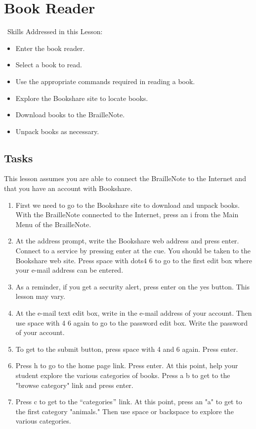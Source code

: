 \documentclass[10pt,letterpaper,twoside]{report}
\begin{document}
{{{\section{ Book Reader}
\
Skills Addressed in this Lesson:
\begin{itemize}
	\item Enter the book reader.
	\item Select a book to read.
	\item Use the appropriate commands required in reading a book.
	\item Explore the Bookshare site to locate books.
	\item Download books to the BrailleNote.
	\item Unpack books as necessary.
\end{itemize}
\subsection{Tasks}
This lesson assumes you are able to connect the BrailleNote to the Internet and that you have an account with Bookshare.
\begin{enumerate}
	\item First we need to go to the Bookshare site to download and unpack books. With the BrailleNote connected to the Internet, press an i from the Main Menu of the BrailleNote.
	\item At the address prompt, write the Bookshare web address and press enter.  Connect to a service by pressing enter at the cue.  You should be taken to the Bookshare web site.  Press space with dots4 6 to go to the first edit box where your e-mail address can be entered.
	\item As a reminder, if you get a security alert, press enter on the yes button.  This lesson may vary.
	\item At the e-mail text edit box, write in the e-mail address of your account.  Then use space with 4 6 again to go to the password edit box.  Write the password of your account.
	\item To get to the submit button, press space with 4 and 6 again.  Press enter.
	\item Press h to go to the home page link.  Press enter.  At this point, help your student explore the various categories of books.  Press a b to get to the "browse category" link and press enter.
	\item Press c to get to the ``categories$"$  link. At this point, press an "a" to get to the first category "animals." Then use space or backspace to explore the various categories.

\end{enumerate}}}}
\end{document}
